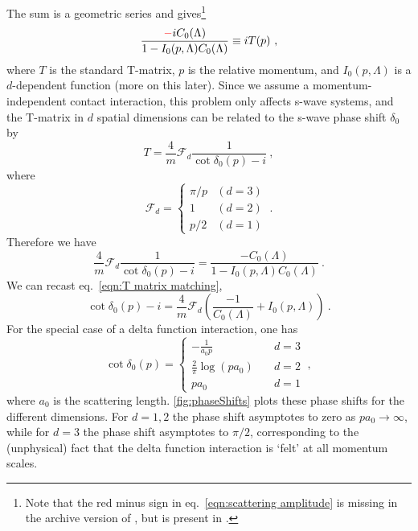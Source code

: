 \documentclass[11pt]{article}
\begin{document}
\noindent The sum is a geometric series and gives\footnote{Note that the {\color{red} red} minus sign in eq.~\eqref{eqn:scattering amplitude} is missing in the archive version of \cite{Beane:2003da}, but is present in \cite{Kaplan:1998we}.}
\begin{equation}\label{eqn:scattering amplitude}
\frac{{\color{red}-}iC_0(\Lambda)}{1-I_0(p,\Lambda)C_0(\Lambda)}\equiv iT(p)\ ,
\end{equation}
where $T$ is the standard T-matrix, $p$ is the relative momentum,  and $I_0(p,\Lambda)$ is a $d$-dependent function (more on this later).  Since we assume a momentum-independent contact interaction, this problem only affects s-wave systems, and the T-matrix in $d$ spatial dimensions can be related to the s-wave phase shift $\delta_0$ by
\begin{equation}
T=\frac{4}{m}\mathcal{F}_d\frac{1}{\cot \delta_0(p)-i}\ ,
\end{equation}
where
\begin{equation}
\mathcal{F}_d=
\begin{cases}
\pi/p & (d=3)\\
1 & (d=2)\\
p/2 & (d=1)
\end{cases}\ .
\end{equation}
Therefore we have
\begin{equation}\label{eqn:T matrix matching}
\boxed{
\frac{4}{m}\mathcal{F}_d\frac{1}{\cot \delta_0(p)-i}=\frac{-C_0(\Lambda)}{1-I_0(p,\Lambda)C_0(\Lambda)}
}\ .
\end{equation}
We can recast eq.~\eqref{eqn:T matrix matching},
\begin{equation}\label{eqn:matching}
\cot \delta_0(p)-i=\frac{4}{m}\mathcal{F}_d\left(\frac{-1}{C_0(\Lambda)}+I_0(p,\Lambda)\right)\ .
\end{equation}
For the special case of a delta function interaction, one has \cite{busch1998}
\begin{equation}\label{eqn:phase shifts}
\cot \delta_0(p) = 
\begin{cases}
 - \frac{1}{a _ { 0 }p }&\quad d=3  \\ 
\frac { 2 } { \pi } \log \left( p a _ { 0 } \right) & \quad d=2\\ 
 p a _ { 0 } &\quad d=1
 \end{cases}\ ,
\end{equation}
where $a_0$ is the scattering length. \autoref{fig:phaseShifts} plots these phase shifts for the different dimensions.  For $d=1,2$ the phase shift asymptotes to zero as $pa_0\to\infty$, while for $d=3$ the phase shift asymptotes to $\pi/2$, corresponding to the (unphysical) fact that the delta function interaction is `felt' at all momentum scales.
\end{document}
